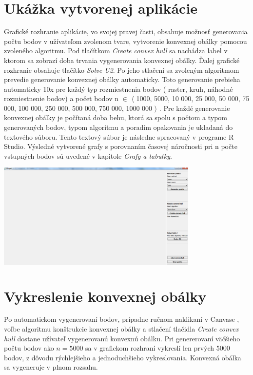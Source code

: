 \documentclass[12pt]{article}
\begin{document}
\clearpage 
\section{Ukážka vytvorenej aplikácie}

Grafické rozhranie aplikácie, vo svojej pravej časti, obsahuje možnosť generovania počtu bodov v užívateľom zvolenom tvare, vytvorenie konvexnej obálky pomocou zvoleného algoritmu. Pod tlačítkom \textit{Create convex hull} sa nachádza label v ktorom sa zobrazí doba trvania vygenerovania konvexnej obálky. Ďalej grafické rozhranie obsahuje tlačítko  \textit{Solve U2}. Po jeho stlačení sa zvoleným algoritmom prevedie generovanie konvexnej obálky automaticky. Toto generovanie prebieha automaticky 10x pre každý typ rozmiestnenia bodov ( raster, kruh, náhodné rozmiestnenie bodov) a počet bodov n $\in$ $\langle$ 1000, 5000, 10 000, 25 000, 50 000, 75 000, 100 000, 250 000, 500 000, 750 000, 1000 000 $\rangle$ . Pre každé generovanie konvexnej obálky je počítaná doba behu, ktorá sa spolu s počtom a typom generovaných bodov, typom algoritmu a poradím opakovania je ukladaná do textového súboru. Tento textový súbor je následne spracovaný v programe R Studio. Výsledné vytvorené grafy s porovnaním časovej náročnosti pri n počte vstupných bodov sú uvedené v kapitole \textit{Grafy a tabuľky}. 

\begin{center}
   \includegraphics[width=10cm]{./img/ukazka_aplikacia1.png}
\end{center}


\clearpage 
\section{Vykreslenie konvexnej obálky}
Po automatickom vygenerovaní bodov, prípadne ručnom naklikaní v Canvase , voľbe algoritmu konštrukcie konvexnej obálky a stlačení tlačidla \textit{Create convex hull} dostane užívateľ vygenerovanú konvexnú obálku. Pri genererovaní väčšieho počtu bodov ako $ n = 5000 $ sa v grafickom rozhraní vykreslí len prvých 5000 bodov, z dôvodu rýchlejšieho a jednoduchšieho vykreslovania. Konvexná obálka sa vygeneruje v plnom rozsahu.
 
\end{document}

